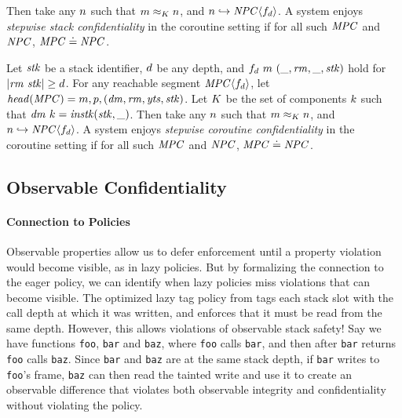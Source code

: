 \documentclass[acmsmall,review,anonymous]{acmart}\settopmatter{printfolios=true,printccs=false,printacmref=false}
\begin{document}
Then take any \(n\) such that \(m \approx_K n\), and
\(n \hookrightarrow \mathit{NPC}\langle f_d \rangle\). A system enjoys
{\em stepwise stack confidentiality} in the coroutine setting if for all
such \(\mathit{MPC}\) and \(\mathit{NPC}\), \(\mathit{MPC} \doteq \mathit{NPC}\).

 Let \(\mathit{stk}\) be a stack identifier, \(d\) be any depth, and
\(f_d ~ m ~ (\_, \mathit{rm}, \_, \mathit{stk})\) hold for \(|\mathit{rm} ~ \mathit{stk}| \geq d\).
For any reachable segment \(\mathit{MPC} \langle f_d \rangle\),
let \(\mathit{head}(\mathit{MPC}) = m,p,(\mathit{dm},\mathit{rm},\mathit{yts},\mathit{stk})\). Let
\(K\) be the set of components \(k\) such that
\(\mathit{dm} ~ k = \mathit{instk}(\mathit{stk},\_)\).
Then take any \(n\) such that \(m \approx_K n\), and
\(n \hookrightarrow \mathit{NPC}\langle f_d \rangle\). A system enjoys
{\em stepwise coroutine confidentiality} in the coroutine setting if for all
such \(\mathit{MPC}\) and \(\mathit{NPC}\), \(\mathit{MPC} \doteq \mathit{NPC}\).


\subsection{Observable Confidentiality}

    \paragraph{Connection to Policies}

    Observable properties allow us to defer enforcement until a property
    violation would become visible, as in lazy policies. But by formalizing
    the connection to the eager policy, we can identify when lazy policies
    miss violations that can become visible. The optimized lazy tag policy from
    \citet{DBLP:conf/sp/RoesslerD18} tags each stack slot with the call depth
    at which it was written, and enforces that it must be read from the
    same depth. However, this allows violations of observable stack safety!
    Say we have functions {\tt foo}, {\tt bar} and {\tt baz}, where {\tt foo}
    calls {\tt bar}, and then after {\tt bar} returns {\tt foo} calls
    {\tt baz}. Since {\tt bar} and {\tt baz} are at the same stack depth, if
    {\tt bar} writes to {\tt foo}'s frame, {\tt baz} can then read the tainted
    write and use it to create an observable difference that violates both
    observable integrity and confidentiality without violating the policy.
\end{document}
